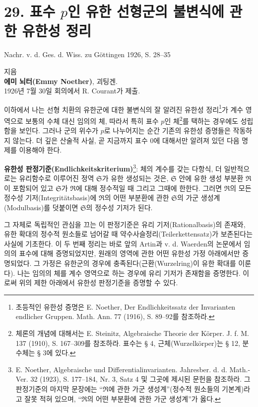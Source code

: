 \documentclass[11pt]{article}
\begin{document}
\section*{29. 표수 $p$인 유한 선형군의 불변식에 관한 유한성 정리}

\begin{center}
Nachr. v. d. Ges. d. Wiss. zu Göttingen 1926, S. 28--35
\end{center}

\setcounter{footnote}{0}

\begin{center}
지음\\[0.5em]
\textbf{에미 뇌터(Emmy Noether)}, 괴팅겐.\\[1em]
1926년 7월 30일 회의에서 R. Courant가 제출.
\end{center}

이하에서 나는 선형 치환의 유한군에 대한 불변식의 잘 알려진 유한성 정리\footnote{초등적인 유한성 증명은 E. Noether, Der Endlichkeitssatz der Invarianten endlicher Gruppen. Math. Ann. 77 (1916), S. 89--92를 참조하라.}가 계수 영역으로 보통의 수체 대신 임의의 체, 따라서 특히 표수 $p$인 체\footnote{체론의 개념에 대해서는 E. Steinitz, Algebraische Theorie der Körper. J. f. M. 137 (1910), S. 167--309를 참조하라. 표수는 § 4, 근체(Wurzelkörper)는 § 12, 분수체는 § 3에 있다.}를 택하는 경우에도 성립함을 보인다. 그러나 군의 위수가 $p$로 나누어지는 순간 기존의 유한성 증명들은 작동하지 않는다. 더 깊은 산술적 사실, 곧 지금까지 표수 0에 대해서만 알려져 있던 다음 명제를 이용해야 한다.

\textbf{유한성 판정기준(Endlichkeitskriterium)}\footnote{E. Noether, Algebraische und Differentialinvarianten. Jahresber. d. d. Math.-Ver. 32 (1923), S. 177--184, Nr. 3, Satz 4 및 그곳에 제시된 문헌을 참조하라. 그 판정기준의 마지막 문장에는 ``$\mathfrak R$에 관한 가군 생성계''(정수적 원소들의 기본계)라고 잘못 적혀 있으며, ``$\mathfrak R$의 어떤 부분환에 관한 가군 생성계''가 옳다.}: 체의 계수를 갖는 다항식, 더 일반적으로는 유리함수로 이루어진 정역 $\mathfrak S$가 유한 생성되는 것은, $\mathfrak S$ 안에 유한 생성 부분환 $\mathfrak R$이 포함되어 있고 $\mathfrak S$가 $\mathfrak R$에 대해 정수적일 때 그리고 그때에 한한다. 그러면 $\mathfrak R$의 모든 정수성 기저(Integritätsbasis)에 $\mathfrak R$의 어떤 부분환에 관한 $\mathfrak S$의 가군 생성계(Modulbasis)를 덧붙이면 $\mathfrak S$의 정수성 기저가 된다.

그 자체로 독립적인 관심을 끄는 이 판정기준은 유리 기저(Rationalbasis)의 존재와, 유한 확대의 정수적 원소들로 넘어갈 때 약수사슬정리(Teilerkettensatz)가 보존된다는 사실에 기초한다. 이 두 번째 정리는 바로 앞의 Artin과 v. d. Waerden의 논문에서 임의의 표수에 대해 증명되었지만, 원래의 영역에 관한 어떤 유한성 가정 아래에서만 증명되었다. 그 가정은 유한군의 경우에 충족된다(근환(Wurzelring)이 유한 확대를 이룬다). 나는 임의의 체를 계수 영역으로 하는 경우에 유리 기저가 존재함을 증명한다. 이로써 위의 제한 아래에서 유한성 판정기준을 증명할 수 있다.
\end{document}
